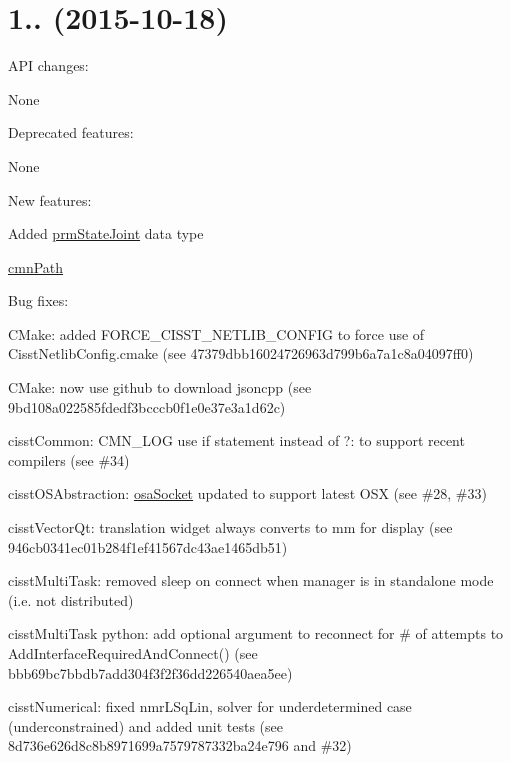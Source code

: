 \section*{1.. (2015-\/10-\/18) }


\begin{DoxyItemize}
\item A\-P\-I changes\-:
\begin{DoxyItemize}
\item None
\end{DoxyItemize}
\item Deprecated features\-:
\begin{DoxyItemize}
\item None
\end{DoxyItemize}
\item New features\-:
\begin{DoxyItemize}
\item Added \hyperlink{classprm_state_joint}{prm\-State\-Joint} data type
\item \hyperlink{classcmn_path}{cmn\-Path}
\end{DoxyItemize}
\item Bug fixes\-:
\begin{DoxyItemize}
\item C\-Make\-: added F\-O\-R\-C\-E\-\_\-\-C\-I\-S\-S\-T\-\_\-\-N\-E\-T\-L\-I\-B\-\_\-\-C\-O\-N\-F\-I\-G to force use of Cisst\-Netlib\-Config.\-cmake (see 47379dbb16024726963d799b6a7a1c8a04097ff0)
\item C\-Make\-: now use github to download jsoncpp (see 9bd108a022585fdedf3bcccb0f1e0e37e3a1d62c)
\item cisst\-Common\-: C\-M\-N\-\_\-\-L\-O\-G use if statement instead of ?\-: to support recent compilers (see \#34)
\item cisst\-O\-S\-Abstraction\-: \hyperlink{classosa_socket}{osa\-Socket} updated to support latest O\-S\-X (see \#28, \#33)
\item cisst\-Vector\-Qt\-: translation widget always converts to mm for display (see 946cb0341ec01b284f1ef41567dc43ae1465db51)
\item cisst\-Multi\-Task\-: removed sleep on connect when manager is in standalone mode (i.\-e. not distributed)
\item cisst\-Multi\-Task python\-: add optional argument to reconnect for \# of attempts to Add\-Interface\-Required\-And\-Connect() (see bbb69bc7bbdb7add304f3f2f36dd226540aea5ee)
\item cisst\-Numerical\-: fixed nmr\-L\-Sq\-Lin, solver for underdetermined case (underconstrained) and added unit tests (see 8d736e626d8c8b8971699a7579787332ba24e796 and \#32)
\end{DoxyItemize}
\end{DoxyItemize}

